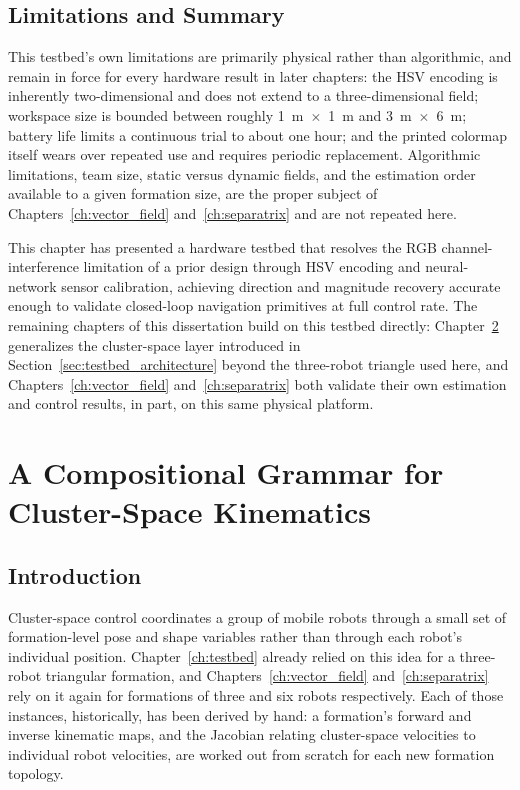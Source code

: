 \documentclass[12pt, letterpaper, oneside]{report}
\begin{document}
\section{Limitations and Summary}
\label{sec:testbed_limitations}

This testbed's own limitations are primarily physical rather than
algorithmic, and remain in force for every hardware result in later
chapters: the HSV encoding is inherently two-dimensional and does not extend
to a three-dimensional field; workspace size is bounded between roughly
1~m~$\times$~1~m and 3~m~$\times$~6~m; battery life limits a continuous
trial to about one hour; and the printed colormap itself wears over
repeated use and requires periodic replacement. Algorithmic limitations,
team size, static versus dynamic fields, and the estimation order available
to a given formation size, are the proper subject of
Chapters~\ref{ch:vector_field} and~\ref{ch:separatrix} and are not repeated
here.

This chapter has presented a hardware testbed that resolves the RGB
channel-interference limitation of a prior design through HSV encoding and
neural-network sensor calibration, achieving direction and magnitude
recovery accurate enough to validate closed-loop navigation primitives at
full control rate. The remaining chapters of this dissertation build on this
testbed directly: Chapter~\ref{ch:cluster_builder} generalizes the
cluster-space layer introduced in Section~\ref{sec:testbed_architecture}
beyond the three-robot triangle used here, and
Chapters~\ref{ch:vector_field} and~\ref{ch:separatrix} both validate their
own estimation and control results, in part, on this same physical
platform.

\chapter{A Compositional Grammar for Cluster-Space Kinematics}
\label{ch:cluster_builder}

\section{Introduction}

Cluster-space control coordinates a group of mobile robots through a small
set of formation-level pose and shape variables rather than through each
robot's individual position. Chapter~\ref{ch:testbed} already relied on this
idea for a three-robot triangular formation, and
Chapters~\ref{ch:vector_field} and~\ref{ch:separatrix} rely on it again for
formations of three and six robots respectively. Each of those instances,
historically, has been derived by hand: a formation's forward and inverse
kinematic maps, and the Jacobian relating cluster-space velocities to
individual robot velocities, are worked out from scratch for each new
formation topology.
\end{document}
